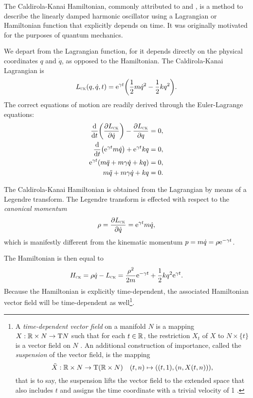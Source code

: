 The Caldirola-Kanai Hamiltonian, commonly attributed to \citet{Caldirola1941} and \citet{Kanai1948}, is a method to describe the linearly damped harmonic oscillator using a Lagrangian or Hamiltonian function that explicitly depends on time. It was originally motivated for the purposes of quantum mechanics.

We depart from the Lagrangian function, for it depends directly on the physical coordinates \(q\) and \(\dot{q}\), as opposed to the Hamiltonian. The Caldirola-Kanai Lagrangian is
\begin{equation}
    L_\text{\tiny{\textsc{CK}}}(q, \dot{q}, t) = \mathrm{e}^{\gamma t}\qty(\frac{1}{2}m\dot{q}^2 - \frac{1}{2}kq^2).
    \label{eq:lag_CK}
\end{equation}
The correct equations of motion are readily derived through the Euler-Lagrange equations:
\begin{equation}
    \begin{split}
        \dv{}{t}\qty(\pdv{\ensuremath{L_\text{\tiny{\textsc{CK}}}}}{\dot{q}}) - \pdv{\ensuremath{L_\text{\tiny{\textsc{CK}}}}}{q} &= 0, \\
        \dv{}{t}\qty(\mathrm{e}^{\gamma t } m \dot{q}) + \mathrm{e}^{\gamma t} kq &= 0, \\
        \mathrm{e}^{\gamma t } \qty(m\ddot{q} + m\gamma\dot{q} + kq)  &= 0, \\
        m\ddot{q} + m\gamma\dot{q} + kq &= 0. \\
    \end{split}
\end{equation}

The Caldirola-Kanai Hamiltonian is obtained from the Lagrangian by means of a Legendre transform. The Legendre transform is effected with respect to the \emph{canonical momentum}
\begin{equation}
     \rho = \pdv{\ensuremath{L_\text{\tiny{\textsc{CK}}}}}{\dot{q}} = \mathrm{e}^{\gamma t} m \dot{q},
\end{equation}
which is manifestly different from the kinematic momentum \(p = m\dot{q} = \rho \mathrm{e}^{-\gamma t}\).

The Hamiltonian is then equal to
\begin{equation}
     H_\text{\tiny{\textsc{CK}}} = \rho\dot{q} - L_\text{\tiny{\textsc{CK}}} =  \frac{\rho^2}{2m}\mathrm{e}^{-\gamma t} + \frac{1}{2}kq^2\mathrm{e}^{\gamma t}.
\end{equation}
Because the Hamiltonian is explicitly time-dependent, the associated Hamiltonian vector field will be time-dependent as well\footnote
{A \emph{time-dependent vector field} on a manifold \(N\) is a mapping \(X: \mathbb{R} \times N \to \mathrm{T}N\) such that for each \(t \in \mathbb{R}\), the restriction \(X_t\) of \(X\) to \(N \times \{t\}\) is a vector field on \(N\) \cite{Libermann1987}. An additional construction of importance, called the \emph{suspension} of the vector field, is the mapping \begin{equation}
     \tilde{X}: \mathbb{R} \times N \to \mathrm{T}(\mathbb{R} \times N) \quad (t, n) \mapsto ((t, 1), (n, X(t, n))),
\end{equation} that is to say, the suspension lifts the vector field to the extended space that also includes \(t\) and assigns the time coordinate with a trivial velocity of 1 \cite{Abraham1978}.}.

